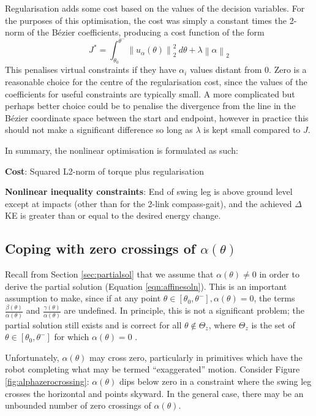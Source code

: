 Regularisation adds some cost based on the values of the decision variables. For the purposes of this optimisation, the cost was simply a constant times the 2-norm of the Bézier coefficients, producing a cost function of the form
\begin{equation} \label{eqn:regcost}
J^* = \int_{\theta_0}^{\theta^-}\left\lVert u_\alpha(\theta) \right\rVert_2^2 ~ d\theta
+ \lambda\left\lVert \alpha \right\rVert_2
\end{equation}
This penalises virtual constraints if they have $\alpha_i$ values distant from 0. Zero is a reasonable choice for the centre of the regularisation cost, since the values of the coefficients for useful constraints are typically small. A more complicated but perhaps better choice could be to penalise the divergence from the line in the Bézier coordinate space between the start and endpoint, however in practice this should not make a significant difference so long as $\lambda$ is kept small compared to $J$.

In summary, the nonlinear optimisation is formulated as such:

\textbf{Cost}: Squared L2-norm of torque plus regularisation

\textbf{Nonlinear inequality constraints}: End of swing leg is above ground level except at impacts (other than for the 2-link compass-gait), and the achieved $\Delta$KE is greater than or equal to the desired energy change.

\subsection{Coping with zero crossings of $\alpha(\theta)$} \label{sec:alphazerocrossing}
Recall from Section \ref{sec:partialsol} that we assume that $\alpha(\theta)\neq 0$ in order to derive the partial solution (Equation \ref{eqn:affinesoln}). This is an important assumption to make, since if at any point $\theta \in [\theta_0, \theta^-], \alpha(\theta) = 0$, the terms $\frac{\beta(\theta)}{\alpha(\theta)}$ and $\frac{\gamma(\theta)}{\alpha(\theta)}$ are undefined. In principle, this is not a significant problem; the partial solution still exists and is correct for all $\theta \not \in \Theta_z$, where $\Theta_z$ is the set of $\theta \in [\theta_0, \theta^-]$ for which $\alpha(\theta)=0$ \cite{shiriaev2005constructive}.

Unfortunately, $\alpha(\theta)$ may cross zero, particularly in primitives which have the robot completing what may be termed ``exaggerated'' motion. Consider Figure \ref{fig:alphazerocrossing}: $\alpha(\theta)$ dips below zero in a constraint where the swing leg crosses the horizontal and points skyward. In the general case, there may be an unbounded number of zero crossings of $\alpha(\theta)$.

